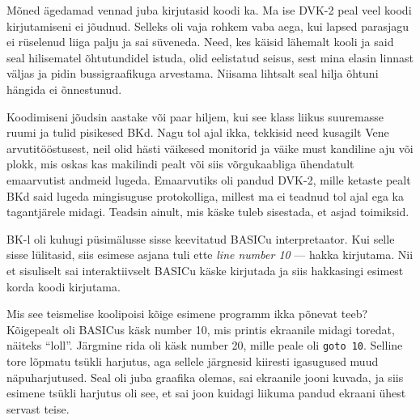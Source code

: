 
Mõned ägedamad vennad juba kirjutasid koodi ka. Ma ise DVK-2 peal veel koodi 
kirjutamiseni ei jõudnud. Selleks oli vaja 
rohkem vaba aega, kui lapsed parasjagu ei rüselenud 
liiga palju ja sai süveneda. Need, kes käisid 
lähemalt kooli ja said seal hilisematel õhtutundidel istuda, olid 
eelistatud seisus, sest mina elasin linnast väljas 
ja pidin bussigraafikuga arvestama. Niisama lihtsalt seal hilja õhtuni hängida 
ei õnnestunud. 

Koodimiseni jõudsin aastake või paar hiljem, kui see klass 
liikus suuremasse ruumi ja tulid pisikesed 
BKd. Nagu tol ajal ikka, tekkisid need kusagilt Vene 
arvutitööstusest, neil olid hästi väikesed monitorid ja väike 
must kandiline aju või plokk, mis oskas kas makilindi pealt 
või siis võrgukaabliga ühendatult emaarvutist andmeid lugeda. Emaarvutiks oli pandud DVK-2, mille 
ketaste pealt BKd said lugeda mingisuguse protokolliga, 
millest ma ei teadnud tol ajal ega ka tagantjärele midagi. Teadsin ainult, 
mis käske tuleb sisestada, et asjad toimiksid.

BK-l oli kuhugi püsimälusse sisse keevitatud 
BASICu interpretaator. Kui selle sisse lülitasid, siis 
esimese asjana tuli ette \emph{line number 10} --- hakka kirjutama. 
Nii et sisuliselt sai interaktiivselt BASICu käske kirjutada ja siis
hakkasingi esimest korda koodi kirjutama. 


Mis see teismelise koolipoisi kõige esimene programm ikka põnevat teeb? 
Kõigepealt oli BASICus käsk number 10, mis printis ekraanile midagi toredat, näiteks 
\enquote{loll}. Järgmine rida 
oli käsk number 20, mille peale oli \verb|goto 10|. Selline tore lõpmatu 
tsükli harjutus, aga sellele järgnesid kiiresti igasugused muud näpuharjutused. 
Seal oli juba graafika olemas, sai ekraanile jooni kuvada, ja siis esimene 
tsükli harjutus oli see, et sai joon kuidagi liikuma pandud ekraani ühest 
servast teise. 

